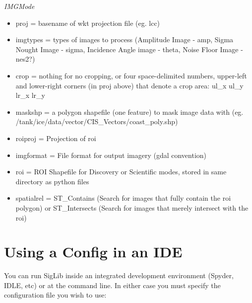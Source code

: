 \documentclass[letterpaper,10pt,openany,oneside]{sphinxmanual}
\begin{document}
\emph{IMGMode}
\begin{itemize}
\item {} 
proj = basename of wkt projection file (eg. lcc)

\item {} 
imgtypes = types of images to process (Amplitude Image - amp, Sigma
Nought Image - sigma, Incidence Angle image - theta, Noise Floor
Image - nes2?)

\item {} 
crop = nothing for no cropping, or four space-delimited numbers,
upper-left and lower-right corners (in proj above) that denote a crop
area: ul\_x ul\_y lr\_x lr\_y

\item {} 
maskshp = a polygon shapefile (one feature) to mask image data with
(eg. /tank/ice/data/vector/CIS\_Vectors/coast\_poly.shp)

\item {} 
roiproj = Projection of roi

\item {} 
imgformat = File format for output imagery (gdal convention)

\item {} 
roi = ROI Shapefile for Discovery or Scientific modes, stored in same
directory as python files

\item {} 
spatialrel = ST\_Contains (Search for images that fully contain the
roi polygon) or ST\_Intersects (Search for images that merely
intersect with the roi)

\end{itemize}


\section{Using a Config in an IDE}
\label{project:using-a-config-in-an-ide}
You can run SigLib inside an integrated development environment (Spyder,
IDLE, etc) or at the command line. In either case you must specify the
configuration file you wish to use:

\end{document}

